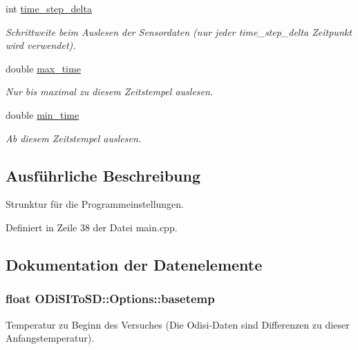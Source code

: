 \begin{DoxyCompactItemize}
int \hyperlink{structODiSIToSD_1_1Options_a57e4e92fe940038d939143626301a61d}{time\-\_\-step\-\_\-delta}
\begin{DoxyCompactList}\small\item\em Schrittweite beim Auslesen der Sensordaten (nur jeder time\-\_\-step\-\_\-delta Zeitpunkt wird verwendet). \end{DoxyCompactList}\item 
double \hyperlink{structODiSIToSD_1_1Options_a43185fa84affbd5e878ea336e15e1038}{max\-\_\-time}
\begin{DoxyCompactList}\small\item\em Nur bis maximal zu diesem Zeitstempel auslesen. \end{DoxyCompactList}\item 
double \hyperlink{structODiSIToSD_1_1Options_a2cf09094e48b7f721d5b4985fdf8bcf4}{min\-\_\-time}
\begin{DoxyCompactList}\small\item\em Ab diesem Zeitstempel auslesen. \end{DoxyCompactList}\end{DoxyCompactItemize}


\subsection{Ausführliche Beschreibung}
Strunktur für die Programmeinstellungen. 

Definiert in Zeile 38 der Datei main.\-cpp.



\subsection{Dokumentation der Datenelemente}
\hypertarget{structODiSIToSD_1_1Options_a6fd0fff59f304ba9e8aee6a7c44a148a}{
\subsubsection[{basetemp}]{\setlength{\rightskip}{0pt plus 5cm}float O\-Di\-S\-I\-To\-S\-D\-::\-Options\-::basetemp}}\label{structODiSIToSD_1_1Options_a6fd0fff59f304ba9e8aee6a7c44a148a}


Temperatur zu Beginn des Versuches (Die Odisi-\/\-Daten sind Differenzen zu dieser Anfangstemperatur). 



